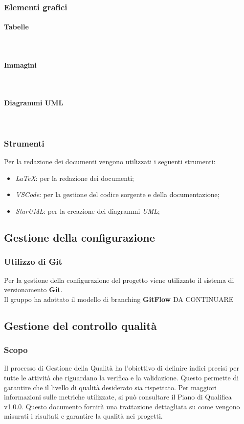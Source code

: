 \subsubsection{Elementi grafici}
\paragraph{Tabelle} ~

\paragraph{Immagini} ~

\paragraph{Diagrammi UML} ~

\subsubsection{Strumenti}
Per la redazione dei documenti vengono utilizzati i seguenti strumenti:
\begin{itemize}
    \item \textit{LaTeX}: per la redazione dei documenti;
    \item \textit{VSCode}: per la gestione del codice sorgente e della documentazione;
    \item \textit{StarUML}: per la creazione dei diagrammi \textit{UML};
\end{itemize}

\subsection{Gestione della configurazione}

\subsubsection{Utilizzo di Git}
Per la gestione della configurazione del progetto viene utilizzato il sistema di versionamento \textbf{Git}.\\
Il gruppo ha adottato il modello di branching \textbf{GitFlow} DA CONTINUARE

\subsection{Gestione del controllo qualità}
\subsubsection{Scopo}
Il processo di Gestione della Qualità ha l'obiettivo di definire indici
precisi per tutte le attività che riguardano la verifica e la validazione.
Questo permette di garantire che il livello di qualità desiderato sia
rispettato. Per maggiori informazioni sulle metriche utilizzate,
si può consultare il Piano di Qualifica v1.0.0.
Questo documento fornirà una trattazione dettagliata su come
vengono misurati i risultati e garantire la qualità nei progetti.
